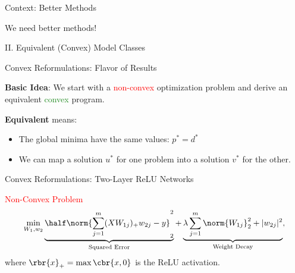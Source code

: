 \documentclass[usenames,dvipsnames,mathserif,notheorems]{beamer}
\newcommand{\red}[1]{\textcolor{Red}{#1}}
\newcommand{\green}[1]{\textcolor{ForestGreen}{#1}}
\begin{document}
\begin{frame}{Context: Better Methods}
	\begin{center}
		{ \huge
			We need better methods!
		}

	\end{center}
\end{frame}



\begin{frame}{}
	\begin{center}
		\huge II. Equivalent (Convex) Model Classes
	\end{center}
\end{frame}

\begin{frame}{Convex Reformulations: Flavor of Results}
	\large

	\textbf{Basic Idea}: We start with a \red{non-convex} optimization problem and derive
	an equivalent \green{convex} program.

	\pause
	\vspace{2em}

	\textbf{Equivalent} means:
	\vspace{0.5em}
	\begin{itemize}
		\item The global minima have the same values: \( p^* = d^* \)
		      \vspace{0.5em}
		\item We can map a solution \( u^* \) for one problem into a solution
		      \( v^* \) for the other.
		      \vspace{0.5em}
	\end{itemize}

\end{frame}


\begin{frame}{Convex Reformulations: Two-Layer ReLU Networks}

	{\large \textcolor{Red}{Non-Convex Problem}}
	\[
		\min_{W_1, w_2} \underbrace{\half \norm{\sum_{j=1}^m (X W_{1j})_+ w_{2j} - y}_2^2}_{\text{Squared Error}}
		+ \underbrace{\lambda \sum_{j=1}^m \norm{W_{1j}}_2^2 + |w_{2j}|^2}_{\text{Weight Decay}},
	\]
	where \( \rbr{x}_+ = \max\cbr{x, 0} \) is the ReLU activation.
	\pause

	\begin{figure}[]
		\centering
		
	\end{figure}

\end{frame}
\end{document}
